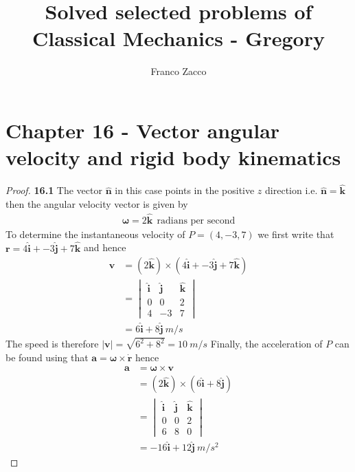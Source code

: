 \documentclass[11pt]{article}
\title{\textbf{Solved selected problems of Classical Mechanics - Gregory}}
\author{Franco Zacco}
\date{}
\newcommand{\hatn}{\bm{\hat{n}}}
\newcommand{\hati}{\bm{\hat{i}}}
\newcommand{\hatj}{\bm{\hat{j}}}
\newcommand{\hatk}{\bm{\hat{k}}}
\theoremstyle{definition}
\begin{document}
\maketitle
\thispagestyle{empty}

\section*{Chapter 16 - Vector angular velocity and rigid body kinematics}

\begin{proof}{\textbf{16.1}}
    The vector $\hatn$ in this case points in the positive $z$ direction
    i.e. $\hatn = \hatk$ then the angular velocity vector is given by
    \begin{align*}
        \bm{\omega} = 2\hatk~~\text{radians per second}
    \end{align*}
    To determine the instantaneous velocity of $P = (4, -3 ,7)$
    we first write that $\bm{r} = 4\hati + -3\hatj + 7\hatk$ and hence
    \begin{align*}
        \bm{v} &= (2\hatk) \times (4\hati + -3\hatj + 7\hatk)\\
            &= \begin{vmatrix}
                \hati & \hatj & \hatk\\
                0 & 0 & 2\\
                4 & -3 & 7
            \end{vmatrix}\\
            &=  6\hati + 8\hatj~m/s
    \end{align*}
    The speed is therefore $|\bm{v}| = \sqrt{6^2 + 8^2} = 10~m/s$
    Finally, the acceleration of $P$ can be found using that
    $\bm{a} = \bm{\omega} \times \bm{\dot{r}}$ hence
    \begin{align*}
        \bm{a} &= \bm{\omega} \times \bm{v}\\
            &= (2\hatk) \times (6\hati + 8\hatj)\\
            &= \begin{vmatrix}
                \hati & \hatj & \hatk\\
                0 & 0 & 2\\
                6 & 8 & 0
            \end{vmatrix}\\
            &= -16\hati + 12\hatj~m/s^2
    \end{align*}
\end{proof}
\cleardoublepage
\end{document}
